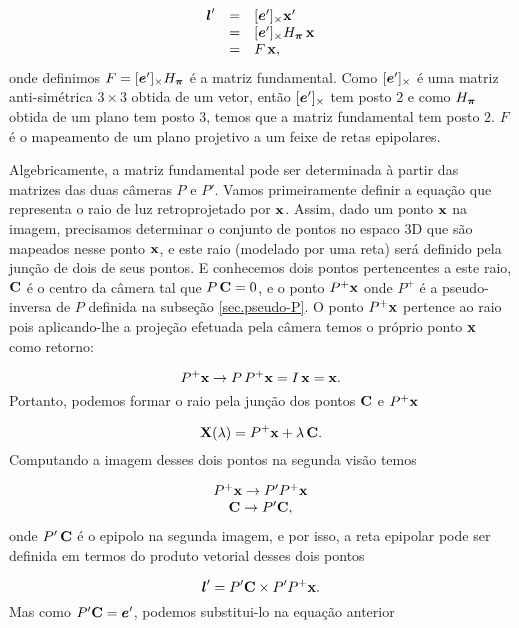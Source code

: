 \begin{equation*}
\begin{array}{rcl}
\boldsymbol{l}'&=&[\boldsymbol{e}']_\times\mathbf{x}'\\
&=&[\boldsymbol{e}']_\times H_{\boldsymbol{\pi}} \,\mathbf{x}\\
&=&F\,\mathbf{x},
\end{array}
\end{equation*} 
onde definimos $F=[\boldsymbol{e}']_\times H_{\boldsymbol{\pi}}$ é a matriz fundamental. Como $[\boldsymbol{e}']_\times$ é uma matriz anti-simétrica $3\times3$ obtida de um vetor, então  $[\boldsymbol{e}']_\times$ tem posto $2$ e como $H_{\boldsymbol{\pi}}$ obtida de um plano tem posto $3$, temos que a matriz fundamental tem posto $2$. $F$ é o mapeamento de um plano projetivo a um feixe de retas epipolares.


Algebricamente, a matriz fundamental pode ser determinada à partir das matrizes das duas câmeras $P$ e $P'$. Vamos primeiramente definir a equação que representa o raio de luz retroprojetado por $\mathbf{x}$. Assim, dado um ponto $\mathbf{x}$ na imagem, precisamos determinar o conjunto de pontos no espaco 3D que são mapeados nesse ponto $\mathbf{x}$, e este raio (modelado por uma reta) será definido pela junção de dois de seus pontos. E conhecemos dois pontos pertencentes a este raio, ${\bf C}$ é o centro da câmera tal que $P\,{\bf C}=0$, e o ponto $P^+\mathbf{x}$ onde $P^+$ é a pseudo-inversa de $P$ definida na subseção \ref{sec.pseudo-P}. O ponto $P^+\mathbf{x}$ pertence ao raio pois aplicando-lhe a projeção efetuada pela câmera temos o próprio ponto $\mathbf{x}$ como retorno:

\begin{equation*}
P^+\mathbf{x} \rightarrow P\,P^+\mathbf{x}=I\,\mathbf{x}=\mathbf{x}.
\end{equation*}
Portanto, podemos formar o raio pela junção dos pontos ${\bf C}$ e $P^+\mathbf{x}$

\begin{equation*}
\mathbf{X}(\lambda)=P^+\mathbf{x}+\lambda\,{\bf C}.
\end{equation*}
Computando a imagem desses dois pontos na segunda visão temos

\begin{equation*}
\begin{array}{c}
P^+\mathbf{x} \rightarrow P'P^+\mathbf{x}\\
{\bf C} \rightarrow P'{\bf C},
\end{array}
\end{equation*}
onde $P'\,{\bf C}$ é o epipolo na segunda imagem, e por isso, a reta epipolar pode ser definida em termos do produto vetorial desses dois pontos

\begin{equation*}
\boldsymbol{l}'=P'{\bf C} \times P'P^+\mathbf{x}.
\end{equation*}
Mas como $P'{\bf C}=\boldsymbol{e}'$, podemos substitui-lo na equação anterior

